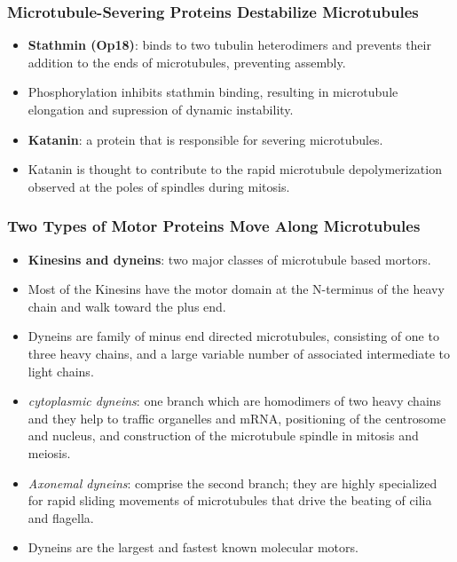 \documentclass[12pt,a4paper]{article}
\begin{document}
\subsubsection{Microtubule-Severing Proteins Destabilize Microtubules}
\begin{itemize}
    \item \textbf{Stathmin (Op18)}: binds to two tubulin heterodimers and prevents their addition to the ends of microtubules, preventing assembly.
    \item Phosphorylation inhibits stathmin binding, resulting in microtubule elongation and supression of dynamic instability.
    \item \textbf{Katanin}: a protein that is responsible for severing microtubules. 
    \item Katanin is thought to contribute to the rapid microtubule depolymerization observed at the poles of spindles during mitosis.
\end{itemize}

\subsubsection{Two Types of Motor Proteins Move Along Microtubules}
\begin{itemize}
    \item \textbf{Kinesins and dyneins}: two major classes of microtubule based mortors.
    \item Most of the Kinesins have the motor domain at the N-terminus of the heavy chain and walk toward the plus end. 
    \item Dyneins are family of minus end directed microtubules, consisting of one to three heavy chains, and a large variable number of associated intermediate to light chains.
    \item \textit{cytoplasmic dyneins}: one branch which are homodimers of two heavy chains and they help to traffic organelles and mRNA, positioning of the centrosome and nucleus, and construction of the microtubule spindle in mitosis and meiosis. 
    \item \textit{Axonemal dyneins}: comprise the second branch; they are highly specialized for rapid sliding movements of microtubules that drive the beating of cilia and flagella.
    \item Dyneins are the largest and fastest known molecular motors.
\end{itemize}
\end{document}

